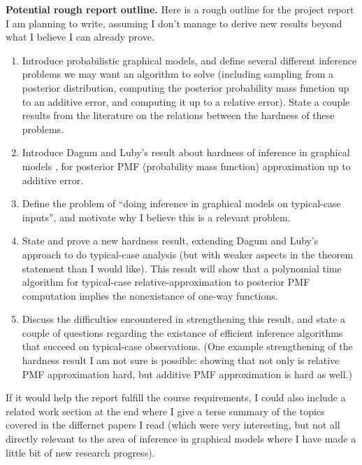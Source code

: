 \documentclass{article}
\begin{document}
\medskip
\noindent \textbf{Potential rough report outline.} Here is a rough outline for the project report I am planning to write, assuming I don't manage to derive new results beyond what I believe I can already prove.
\begin{enumerate}
    \item Introduce probabilistic graphical models, and define several different inference problems we may want an algorithm to solve (including sampling from a posterior distribution, computing the posterior probability mass function up to an additive error, and computing it up to a relative error).  State a couple results from the literature on the relations between the hardness of these problems.
    \item Introduce Dagum and Luby's result about hardness of inference in graphical models \cite{dagum1993}, for posterior PMF (probability mass function) approximation up to additive error.
    \item Define the problem of ``doing inference in graphical models on typical-case inputs'', and motivate why I believe this is a relevant problem.
    \item State and prove a new hardness result, extending Dagum and Luby's approach to do typical-case analysis (but with weaker aspects in the theorem statement than I would like).  This result will show that a polynomial time algorithm for typical-case relative-approximation to posterior PMF computation implies the nonexistance of one-way functions.
    \item Discuss the difficulties encountered in strengthening this result, and state a couple of questions regarding the existance of efficient inference algorithms that succeed on typical-case observations.  (One example strengthening of the hardness result I am not sure is possible: showing that not only is relative PMF approximation hard, but additive PMF approximation is hard as well.)
\end{enumerate}

\noindent If it would help the report fulfill the course requirements, I could also include a related work section at the end where I give a terse summary of the topics covered in the differnet papers I read (which were very interesting, but not all directly relevant to the area of inference in graphical models where I have made a little bit of new research progress).
\end{document}

